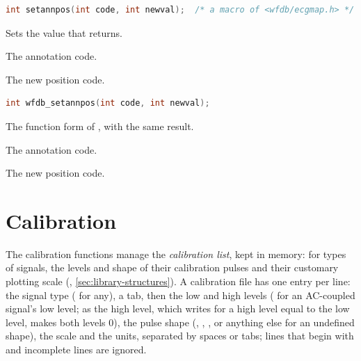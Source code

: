 \begin{lstlisting}[language=C,style=signature]
int setannpos(int code, int newval);  /* a macro of <wfdb/ecgmap.h> */
\end{lstlisting}
Sets the value that  returns.
\begin{params}
\item[code] The annotation code.
\item[newval] The new position code.
\end{params}

\begin{lstlisting}[language=C,style=signature]
int wfdb_setannpos(int code, int newval);
\end{lstlisting}
The function form of , with the same result.
\begin{params}
\item[code] The annotation code.
\item[newval] The new position code.
\end{params}

\section{Calibration}
\label{sec:library-calibration}

The calibration functions manage the \emph{calibration list}, kept in
memory: for types of signals, the levels and shape of their calibration
pulses and their customary plotting scale (,
\cref{sec:library-structures}). A calibration file has one entry per line:
the signal type (\code{*} for any), a tab, then the low and high levels
(\code{-} for an AC-coupled signal's low level; \code{-} as the high level,
which  writes for a high level equal to the low level, makes
both levels 0), the pulse shape (, ,
, or anything else for an undefined shape), the scale and the
units, separated by spaces or tabs; lines that begin with \code{\#} and
incomplete lines are ignored.

